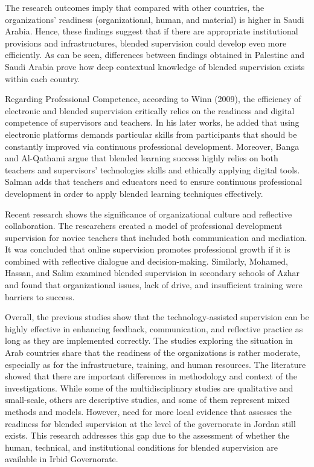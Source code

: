 \documentclass[10pt]{NSP1}
\begin{document}
The research outcomes imply that compared with other countries, the organizations' readiness (organizational, human, and material) is higher in Saudi Arabia. Hence, these findings suggest that if there are appropriate institutional provisions and infrastructures, blended supervision could develop even more efficiently. As can be seen, differences between findings obtained in Palestine and Saudi Arabia prove how deep contextual knowledge of blended supervision exists within each country.

Regarding Professional Competence, according to Winn (2009), the efficiency of electronic and blended supervision critically relies on the readiness and digital competence of supervisors and teachers. In his later works, he added that using electronic platforms demands particular skills from participants that should be constantly improved via continuous professional development. Moreover, Banga and Al-Qathami \cite{ref29} argue that blended learning success highly relies on both teachers and supervisors' technologies skills and ethically applying digital tools. Salman \cite{ref22} adds that teachers and educators need to ensure continuous professional development in order to apply blended learning techniques effectively.

Recent research shows the significance of organizational culture and reflective collaboration. The researchers created a model of professional development supervision for novice teachers that included both communication and mediation. It was concluded that online supervision promotes professional growth if it is combined with reflective dialogue and decision-making. Similarly, Mohamed, Hassan, and Salim \cite{ref30} examined blended supervision in secondary schools of Azhar and found that organizational issues, lack of drive, and insufficient training were barriers to success.

Overall, the previous studies show that the technology-assisted supervision can be highly effective in enhancing feedback, communication, and reflective practice as long as they are implemented correctly. The studies exploring the situation in Arab countries share that the readiness of the organizations is rather moderate, especially as for the infrastructure, training, and human resources. The literature showed that there are important differences in methodology and context of the investigations. While some of the multidisciplinary studies are qualitative and small-scale, others are descriptive studies, and some of them represent mixed methods and models. However, need for more local evidence that assesses the readiness for blended supervision at the level of the governorate in Jordan still exists. This research addresses this gap due to the assessment of whether the human, technical, and institutional conditions for blended supervision are available in Irbid Governorate.
\end{document}
